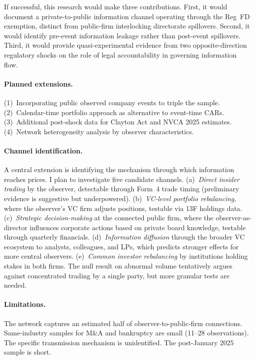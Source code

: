 \documentclass[12pt]{article}
\begin{document}
If successful, this research would make three contributions. First, it would document a private-to-public information channel operating through the Reg~FD exemption, distinct from public-firm interlocking directorate spillovers. Second, it would identify pre-event information leakage rather than post-event spillovers. Third, it would provide quasi-experimental evidence from two opposite-direction regulatory shocks on the role of legal accountability in governing information flow.

\paragraph{Planned extensions.} (1)~Incorporating public observed company events to triple the sample. (2)~Calendar-time portfolio approach as alternative to event-time CARs. (3)~Additional post-shock data for Clayton Act and NVCA 2025 estimates. (4)~Network heterogeneity analysis by observer characteristics.

\paragraph{Channel identification.} A central extension is identifying the mechanism through which information reaches prices. I plan to investigate five candidate channels. (a)~\textit{Direct insider trading} by the observer, detectable through Form~4 trade timing (preliminary evidence is suggestive but underpowered). (b)~\textit{VC-level portfolio rebalancing}, where the observer's VC firm adjusts positions, testable via 13F holdings data. (c)~\textit{Strategic decision-making} at the connected public firm, where the observer-as-director influences corporate actions based on private board knowledge, testable through quarterly financials. (d)~\textit{Information diffusion} through the broader VC ecosystem to analysts, colleagues, and LPs, which predicts stronger effects for more central observers. (e)~\textit{Common investor rebalancing} by institutions holding stakes in both firms. The null result on abnormal volume tentatively argues against concentrated trading by a single party, but more granular tests are needed.

\paragraph{Limitations.} The network captures an estimated half of observer-to-public-firm connections. Same-industry samples for M\&A and bankruptcy are small (11--28 observations). The specific transmission mechanism is unidentified. The post-January 2025 sample is short.

\newpage


\end{document}
